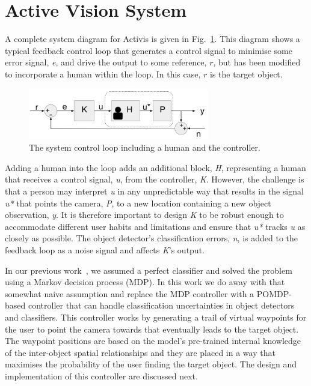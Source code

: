 \documentclass[runningheads]{llncs}
\begin{document}
\section{Active Vision System}\label{sec:active-vision}

A complete system diagram for Activis is given in Fig.~\ref{fig:sys-diagram}. 
This diagram shows a typical feedback control loop that generates a control signal to minimise some error signal, \emph{e}, and drive the output to some reference, $r$, but has been modified to incorporate a human within the loop.
In this case, $r$ is the target object. 

\begin{figure}[t]
  \centering
  \includegraphics[width=0.7\textwidth]{figures/control_loop.png}
  \caption{The system control loop including a human and the controller.}\label{fig:sys-diagram}
\end{figure}

Adding a human into the loop adds an additional block, \emph{H}, representing a human that receives a control signal, \emph{u}, from the controller, \emph{K}. 
However, the challenge is that a person may interpret \emph{u} in any unpredictable way that results in the signal \emph{u*} that points the camera, \emph{P}, to a new location containing a new object observation, \emph{y}.
It is therefore important to design \emph{K} to be robust enough to accommodate different user habits and limitations and ensure that \emph{u*} tracks \emph{u} as closely as possible. 
The object detector's classification errors, \emph{n}, is added to the feedback loop as a noise signal and affects \emph{K}'s output.

In our previous work~\cite{lock2019active}, we assumed a perfect classifier and solved the problem using a Markov decision process (MDP). 
In this work we do away with that somewhat naive assumption and replace the MDP controller with a POMDP-based controller that can handle classification uncertainties in object detectors and classifiers. 
This controller works by generating a trail of virtual waypoints for the user to point the camera towards that eventually leads to the target object.
The waypoint positions are based on the model's pre-trained internal knowledge of the inter-object spatial relationships and they are placed in a way that maximises the probability of the user finding the target object.
The design and implementation of this controller are discussed next.
\end{document}
